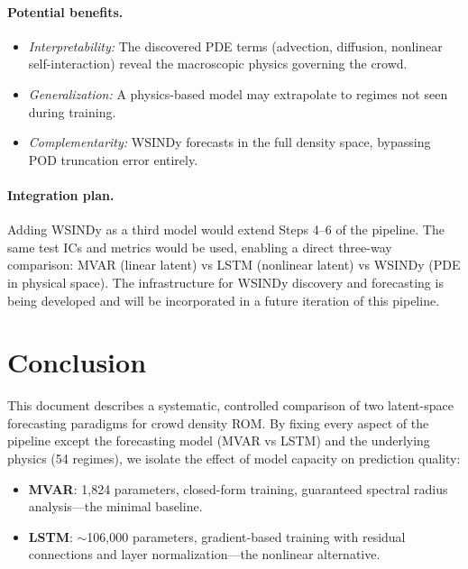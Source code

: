 \documentclass[11pt]{article}
\newcommand{\MVAR}{\textcolor{mvarblue}{\textbf{MVAR}}}
\newcommand{\LSTM}{\textcolor{lstmorange}{\textbf{LSTM}}}
\begin{document}
\paragraph{Potential benefits.}
\begin{itemize}[nosep]
    \item \emph{Interpretability:} The discovered PDE terms (advection,
        diffusion, nonlinear self-interaction) reveal the macroscopic
        physics governing the crowd.
    \item \emph{Generalization:} A physics-based model may extrapolate
        to regimes not seen during training.
    \item \emph{Complementarity:} WSINDy forecasts in the full density
        space, bypassing POD truncation error entirely.
\end{itemize}

\paragraph{Integration plan.}
Adding WSINDy as a third model would extend Steps 4--6 of the pipeline.
The same test ICs and metrics would be used, enabling a direct three-way
comparison: MVAR (linear latent) vs LSTM (nonlinear latent) vs WSINDy
(PDE in physical space).  The infrastructure for WSINDy discovery and
forecasting is being developed and will be incorporated in a future
iteration of this pipeline.


\section{Conclusion}
\label{sec:conclusion}

This document describes a systematic, controlled comparison of two
latent-space forecasting paradigms for crowd density ROM.  By fixing
every aspect of the pipeline except the forecasting model (MVAR vs LSTM)
and the underlying physics (54 regimes), we isolate the effect of model
capacity on prediction quality:

\begin{itemize}[nosep]
    \item \MVAR{}: 1{,}824 parameters, closed-form training, guaranteed
        spectral radius analysis---the minimal baseline.
    \item \LSTM{}: $\sim$106{,}000 parameters, gradient-based training
        with residual connections and layer normalization---the nonlinear
        alternative.
\end{itemize}
\end{document}

